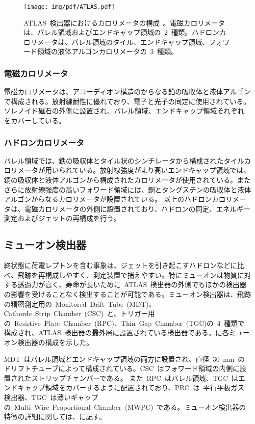 \begin{figure}[H]
        \centering   
        \texttt{[image: img/pdf/ATLAS.pdf]}
        \caption[ATLAS~検出器におけるカロリメータの構成]{ATLAS~検出器におけるカロリメータの構成~\cite{TR:01}。電磁カロリメータは、バレル領域およびエンドキャップ領域の~2~種類。ハドロンカロリメータは、バレル領域のタイル、エンドキャップ領域、フォワード領域の液体アルゴンカロリメータの~3~種類。}\label{fig:calo}
\end{figure}

\subsubsection{電磁カロリメータ}
電磁カロリメータは、アコーディオン構造のからなる鉛の吸収体と液体アルゴンで構成される。放射線耐性に優れており、電子と光子の同定に使用されている。ソレノイド磁石の外側に設置され、バレル領域、エンドキャップ領域それぞれをカバーしている。

\subsubsection{ハドロンカロリメータ}
バレル領域では、鉄の吸収体とタイル状のシンチレータから構成されたタイルカロリメータが用いられている。放射線強度がより高いエンドキャップ領域では、銅の吸収体と液体アルゴンから構成されたカロリメータが使用されている。またさらに放射線強度の高いフォワード領域には、銅とタングステンの吸収体と液体アルゴンからなるカロリメータが設置されている。
以上のハドロンカロリメータは、電磁カロリメータの外側に設置されており、ハドロンの同定、エネルギー測定およびジェットの再構成を行う。


\subsection{ミューオン検出器}
終状態に荷電レプトンを含む事象は、ジェットを引き起こすハドロンなどに比べ、飛跡を再構成しやすく、測定装置で捕えやすい。特にミューオンは物質に対する透過力が高く、寿命が長いために~ATLAS~検出器の外側でもほかの検出器の影響を受けることなく検出することが可能である。ミューオン検出器は、飛跡の精密測定用の~Monitored~Drift~Tube~(MDT)、Cathorde~Strip~Chamber~(CSC)~と、トリガー用の~Resistive~Plate~Chamber~(RPC)、Thin~Gap~Chamber~(TGC)の~4~種類で構成され、ATLAS~検出器の最外層に設置されている検出器である。に各ミューオン検出器の構成を示した。

MDT~はバレル領域とエンドキャップ領域の両方に設置され、直径~30~mm~のドリフトチューブによって構成されている。CSC~はフォワード領域の内側に設置されたストリップチェンバーである。 また~RPC~はバレル領域、TGC~はエンドキャップ領域をカバーするように配置されており、PRC~は~平行平板ガス検出器、TGC~は薄いギャップの~Multi~Wire~Proportional~Chamber~(MWPC)~である。ミューオン検出器の特徴の詳細に関しては、に記す。

